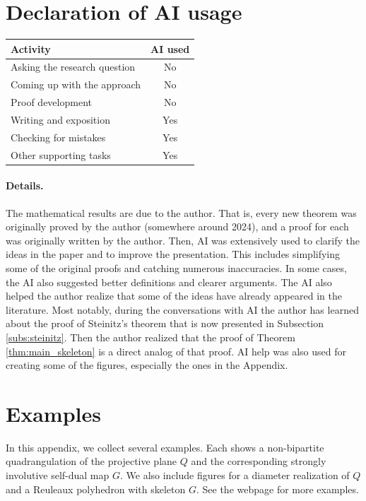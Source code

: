 \documentclass[10pt,a4paper]{article}
\newcounter{example}
\begin{document}
\section*{Declaration of AI usage}

\begin{center}
\begin{tabular}{l c}
\hline
\textbf{Activity} & \textbf{AI used} \\
\hline
Asking the research question     & No \\
Coming up with the approach      & No \\
Proof development                & No \\
Writing and exposition           & Yes \\
Checking for mistakes                & Yes \\
Other supporting tasks           & Yes \\
\hline
\end{tabular}
\end{center}

\paragraph{Details.}

The mathematical results are due to the author. That is, every new theorem was originally proved by the author (somewhere around 2024), and a proof for each was originally written by the author. Then, AI was extensively used to clarify the ideas in the paper and to improve the presentation. This includes simplifying some of the original proofs and catching numerous inaccuracies. In some cases, the AI also suggested better definitions and clearer arguments. The AI also helped the author realize that some of the ideas have already appeared in the literature. Most notably, during the conversations with AI the author has learned about the proof of Steinitz's theorem that is now presented in Subsection \ref{subs:steinitz}. Then the author realized that the proof of Theorem \ref{thm:main_skeleton} is a direct analog of that proof. AI help was also used for creating some of the figures, especially the ones in the Appendix.



\appendix
\section{Examples}\label{app:examples}

In this appendix, we collect several examples. Each shows a non-bipartite quadrangulation of the projective plane $Q$ and the corresponding strongly involutive self-dual map $G$.  We also include figures for a diameter realization of $Q$ and a Reuleaux polyhedron with skeleton $G$. See the webpage \cite{damasdi_selfdual_visualizations} for more examples.
\end{document}
